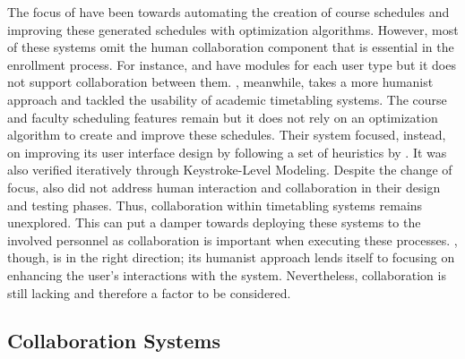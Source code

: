 The focus of \cite{Assyst, Assyst2, eAssyst, UPM, bulacanState, 2013Nigeria, Oprea2007, UniTime} have been towards automating the creation of course schedules and improving these generated schedules with optimization algorithms. However, most of these systems omit the human collaboration component that is essential in the enrollment process. For instance, \cite{Assyst} and \cite{Assyst2} have modules for each user type but it does not support collaboration between them. \cite{arrowSmith}, meanwhile, takes a more humanist approach and tackled the usability of academic timetabling systems. The course and faculty scheduling features remain but it does not rely on an optimization algorithm to create and improve these schedules. Their system focused, instead, on improving its user interface design by following a set of heuristics by \cite{Paz}. It was also verified iteratively through Keystroke-Level Modeling. Despite the change of focus, \cite{arrowSmith} also did not address human interaction and collaboration in their design and testing phases. Thus, collaboration within timetabling systems remains unexplored. This can put a damper towards deploying these systems to the involved personnel as collaboration is important when executing these processes. \cite{arrowSmith}, though, is in the right direction; its humanist approach lends itself to focusing on enhancing the user's interactions with the system. Nevertheless, collaboration is still lacking and therefore a factor to be considered.


\subsection{Collaboration Systems}

